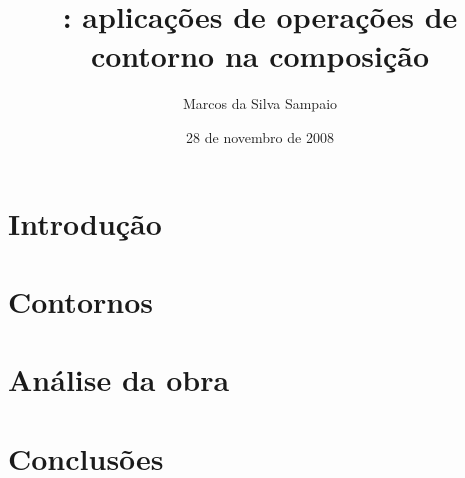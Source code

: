 \documentclass{beamer}
\title{\obra{}: aplicações de operações de contorno na composição}
\author{Marcos da Silva Sampaio}
\date{28 de novembro de 2008}
\begin{document}
\frame{\titlepage}

\section{Introdução}

\frame{
  \frametitle{}
}

\section{Contornos}

\frame{
  \frametitle{}
}

\section{Análise da obra}

\frame{
  \frametitle{}
}

\section{Conclusões}

\frame{
  \frametitle{}
}
\end{document}
